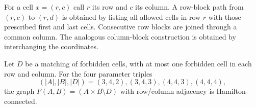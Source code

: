 
For a cell $x=(r,c)$ call $r$ its row and $c$ its column.  A row-block path
from $(r,c)$ to $(r,d)$ is obtained by listing all allowed cells in row $r$
with those prescribed first and last cells.  Consecutive row blocks are joined
through a common column.  The analogous column-block construction is obtained
by interchanging the coordinates.

\begin{lemma}
\label{lem:rook-splice-hc}
Let $D$ be a matching of forbidden cells, with at most one forbidden cell in
each row and column.  For the four parameter triples
\[
 (|A|,|B|,|D|)=(3,4,2),(3,4,3),(4,4,3),(4,4,4),
\]
the graph $F(A,B)=(A\times B\setminus D)$ with row/column adjacency is
Hamilton-connected.
\end{lemma}

